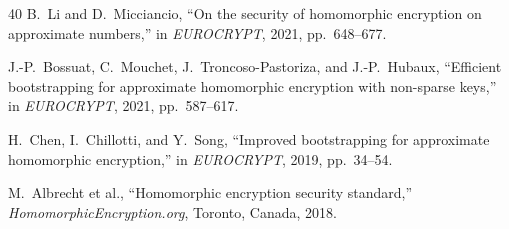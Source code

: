 \begin{thebibliography}{40}
B.~Li and D.~Micciancio, ``On the security of homomorphic encryption on approximate numbers,'' in \emph{EUROCRYPT}, 2021, pp.~648--677.

J.-P.~Bossuat, C.~Mouchet, J.~Troncoso-Pastoriza, and J.-P.~Hubaux, ``Efficient bootstrapping for approximate homomorphic encryption with non-sparse keys,'' in \emph{EUROCRYPT}, 2021, pp.~587--617.

H.~Chen, I.~Chillotti, and Y.~Song, ``Improved bootstrapping for approximate homomorphic encryption,'' in \emph{EUROCRYPT}, 2019, pp.~34--54.

M.~Albrecht et al., ``Homomorphic encryption security standard,'' \emph{HomomorphicEncryption.org}, Toronto, Canada, 2018.

\end{thebibliography}


